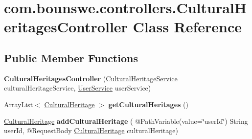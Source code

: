 \hypertarget{classcom_1_1bounswe_1_1controllers_1_1_cultural_heritages_controller}{}\section{com.\+bounswe.\+controllers.\+Cultural\+Heritages\+Controller Class Reference}
\label{classcom_1_1bounswe_1_1controllers_1_1_cultural_heritages_controller}
\subsection*{Public Member Functions}
\begin{DoxyCompactItemize}
\item 
\mbox{\label{classcom_1_1bounswe_1_1controllers_1_1_cultural_heritages_controller_a6194a7de4bb7a1a331fc8cabfd022d33}} 
{\bfseries Cultural\+Heritages\+Controller} (\hyperlink{classcom_1_1bounswe_1_1services_1_1_cultural_heritage_service}{Cultural\+Heritage\+Service} cultural\+Heritage\+Service, \hyperlink{classcom_1_1bounswe_1_1services_1_1_user_service}{User\+Service} user\+Service)
\item 
\mbox{\label{classcom_1_1bounswe_1_1controllers_1_1_cultural_heritages_controller_a93a08a5718c76206db576488c1c00829}} 
Array\+List$<$ \hyperlink{classcom_1_1bounswe_1_1models_1_1_cultural_heritage}{Cultural\+Heritage} $>$ {\bfseries get\+Cultural\+Heritages} ()
\item 
\mbox{\label{classcom_1_1bounswe_1_1controllers_1_1_cultural_heritages_controller_a3179f39e07173126f41d15e143dca0a9}} 
\hyperlink{classcom_1_1bounswe_1_1models_1_1_cultural_heritage}{Cultural\+Heritage} {\bfseries add\+Cultural\+Heritage} ( @Path\+Variable(value=\char`\"{}user\+Id\char`\"{}) String user\+Id, @Request\+Body \hyperlink{classcom_1_1bounswe_1_1models_1_1_cultural_heritage}{Cultural\+Heritage} cultural\+Heritage)
\item 
\mbox{\label{classcom_1_1bounswe_1_1controllers_1_1_cultural_heritages_controller_a6d23f337f8b4cb0292ce81d960083d61}} 

\end{DoxyCompactItemize}
